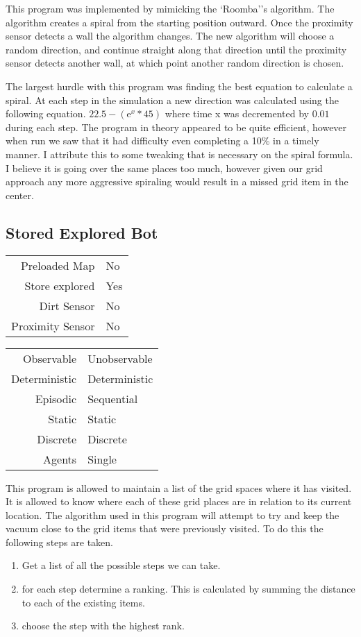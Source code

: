 \documentclass[letterpaper]{article}
\begin{document}
 		
 		
This program was implemented by mimicking the `Roomba''s algorithm.  The algorithm creates a spiral from the starting position outward.  Once the proximity sensor detects a wall the algorithm changes.  The new algorithm will choose a random direction, and continue straight along that direction until the proximity sensor detects another wall, at which point another random direction is chosen.  

The largest hurdle with this program was finding the best equation to calculate a spiral.  At each step in the simulation a new direction was calculated using the following equation.
$ 22.5 - (\mathrm {e} ^ x * 45)$
where time x was decremented by $0.01$ during each step.  The program in theory appeared to be quite efficient, however when run we saw that it had difficulty even completing a 10\% in a timely manner.  I attribute this to some tweaking that is necessary on the spiral formula.  I believe it is going over the same places too much, however given our grid approach any more aggressive spiraling would result in a missed grid item in the center.


\subsection{Stored Explored Bot}

\begin{tabular}{ r | l }  
	Preloaded Map 		& No \\
	Store explored 		& Yes \\
	Dirt Sensor 		& No \\
	Proximity Sensor 	& No \\
\end{tabular}
\quad
\begin{tabular}{ r | l }  
	Observable 		& Unobservable 	\\
	Deterministic 	& Deterministic \\
	Episodic		& Sequential	\\
	Static		 	& Static 		\\
	Discrete 		& Discrete 		\\
	Agents		 	& Single 		\\	
\end{tabular}
This program is allowed to maintain a list of the grid spaces where it has visited.  It is allowed to know where each of these grid places are in relation to its current location.
The algorithm used in this program will attempt to try and keep the vacuum close to the grid items that were previously visited.  To do this the following steps are taken.  
\begin{enumerate}  
\item Get a list of all the possible steps we can take.
\item for each step determine a ranking.  This is calculated by summing the distance to each of the existing items.
\item choose the step with the highest rank.
\end{enumerate}
\end{document}
